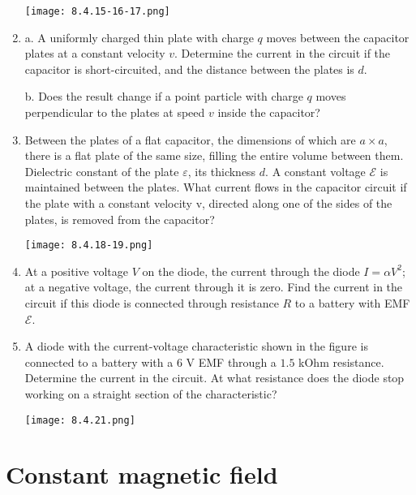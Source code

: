 \documentclass{article}
\begin{document}
\begin{enumerate}[label=8.4.\arabic*]
\begin{center}
    \texttt{[image: 8.4.15-16-17.png]}
\end{center}

\item a. A uniformly charged thin plate with charge $q$ moves between the capacitor plates at a constant velocity $v$. Determine the current in the circuit if the capacitor is short-circuited, and the distance between the plates is $d$. 

b. Does the result change if a point particle with charge $q$ moves perpendicular to the plates at speed $v$ inside the capacitor?

\item Between the plates of a flat capacitor, the dimensions of which are $a \times a$, there is a flat plate of the same size, filling the entire volume between them. Dielectric constant of the plate $\varepsilon$, its thickness $d$. A constant voltage $\mathcal{E}$ is maintained between the plates. What current flows in the capacitor circuit if the plate with a constant velocity v, directed along one of the sides of the plates, is removed from the capacitor?

\begin{center}
    \texttt{[image: 8.4.18-19.png]}
\end{center}


\item At a positive voltage $V$ on the diode, the current through the diode $I = \alpha V^2$; at a negative voltage, the current through it is zero. Find the current in the circuit if this diode is connected through resistance $R$ to a battery with EMF$ \mathcal{E}$.

\item A diode with the current-voltage characteristic shown in the figure is connected to a battery with a $6$ V EMF through a $1.5$ kOhm resistance. Determine the current in the circuit. At what resistance does the diode stop working on a straight section of the characteristic?

\begin{center}
    \texttt{[image: 8.4.21.png]}
\end{center}


\end{enumerate}


\section{Constant magnetic field}
\end{document}
